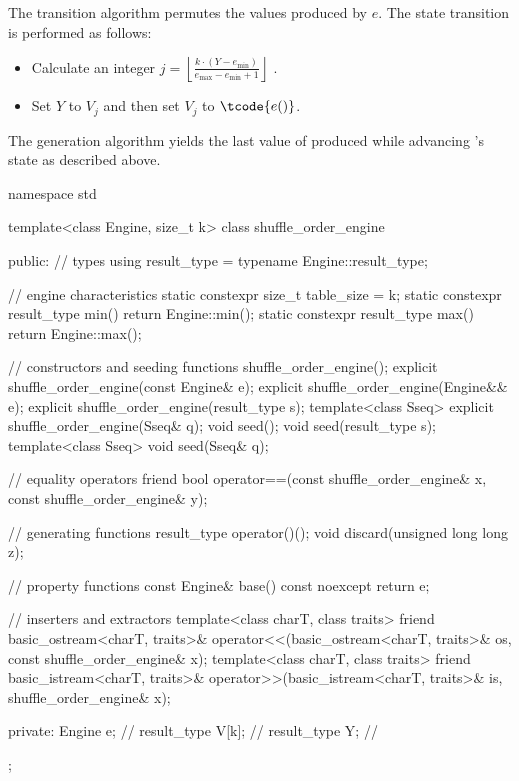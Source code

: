 \pnum
The transition algorithm
permutes the values produced by $e$.
The state transition is performed as follows:
\begin{itemize}
 \item
   Calculate an integer
   $j = \left\lfloor \frac{k \cdot (Y - e_{\min})}
                          {e_{\max} - e_{\min} +1}
        \right\rfloor
   $%
   .
 \item
   Set $Y$ to $V_j$ and then set $V_j$ to $\tcode{e()}$.
\end{itemize}

\pnum
The generation algorithm
yields the last value of 
 produced while advancing 's state as described above.

%
%
\begin{codeblock}
namespace std {
  template<class Engine, size_t k>
  class shuffle_order_engine {
  public:
    // types
    using result_type = typename Engine::result_type;

    // engine characteristics
    static constexpr size_t table_size = k;
    static constexpr result_type min() { return Engine::min(); }
    static constexpr result_type max() { return Engine::max(); }

    // constructors and seeding functions
    shuffle_order_engine();
    explicit shuffle_order_engine(const Engine& e);
    explicit shuffle_order_engine(Engine&& e);
    explicit shuffle_order_engine(result_type s);
    template<class Sseq> explicit shuffle_order_engine(Sseq& q);
    void seed();
    void seed(result_type s);
    template<class Sseq> void seed(Sseq& q);

    // equality operators
    friend bool operator==(const shuffle_order_engine& x, const shuffle_order_engine& y);

    // generating functions
    result_type operator()();
    void discard(unsigned long long z);

    // property functions
    const Engine& base() const noexcept { return e; }

    // inserters and extractors
    template<class charT, class traits>
      friend basic_ostream<charT, traits>&
        operator<<(basic_ostream<charT, traits>& os, const shuffle_order_engine& x);
    template<class charT, class traits>
      friend basic_istream<charT, traits>&
        operator>>(basic_istream<charT, traits>& is, shuffle_order_engine& x);

  private:
    Engine e;           // \expos
    result_type V[k];   // \expos
    result_type Y;      // \expos
  };
}
\end{codeblock}

